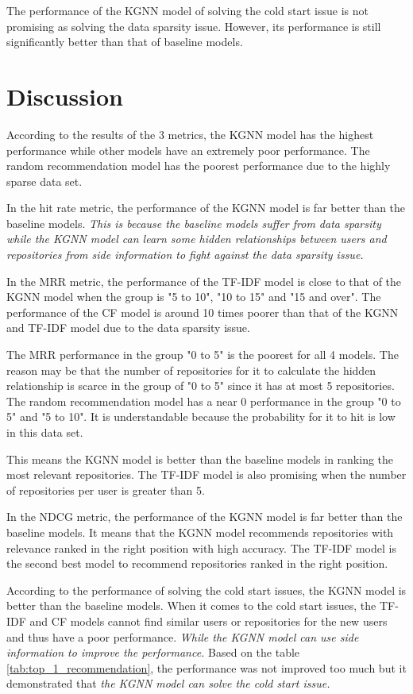 \documentclass[11pt,twoside]{report}
\begin{document}
The performance of the KGNN model of solving the cold start issue is not promising as solving the data sparsity issue. However, its performance is still significantly better than that of baseline models.

\section{Discussion}
According to the results of the 3 metrics, the KGNN model has the highest performance while other models have an extremely poor performance. The random recommendation model has the poorest performance due to the highly sparse data set.

In the hit rate metric, the performance of the KGNN model is far better than the baseline models. \textit{This is because the baseline models suffer from data sparsity while the KGNN model can learn some hidden relationships between users and repositories from side information to fight against the data sparsity issue.}

In the MRR metric, the performance of the TF-IDF model is close to that of the KGNN model when the group is "5 to 10", "10 to 15" and "15 and over". The performance of the CF model is around 10 times poorer than that of the KGNN and TF-IDF model due to the data sparsity issue.

The MRR performance in the group "0 to 5" is the poorest for all 4 models. The reason may be that the number of repositories for it to calculate the hidden relationship is scarce in the group of "0 to 5" since it has at most 5 repositories. The random recommendation model has a near 0 performance in the group "0 to 5" and "5 to 10". It is understandable because the probability for it to hit is low in this data set.

This means the KGNN model is better than the baseline models in ranking the most relevant repositories. The TF-IDF model is also promising when the number of repositories per user is greater than 5.

In the NDCG metric, the performance of the KGNN model is far better than the baseline models. It means that the KGNN model recommends repositories with relevance ranked in the right position with high accuracy. The TF-IDF model is the second best model to recommend repositories ranked in the right position.

According to the performance of solving the cold start issues, the KGNN model is better than the baseline models. When it comes to the cold start issues, the TF-IDF and CF models cannot find similar users or repositories for the new users and thus have a poor performance. \textit{While the KGNN model can use side information to improve the performance.} Based on the table \ref{tab:top_1_recommendation}, the performance was not improved too much but it demonstrated that \textit{the KGNN model can solve the cold start issue.}
\end{document}
